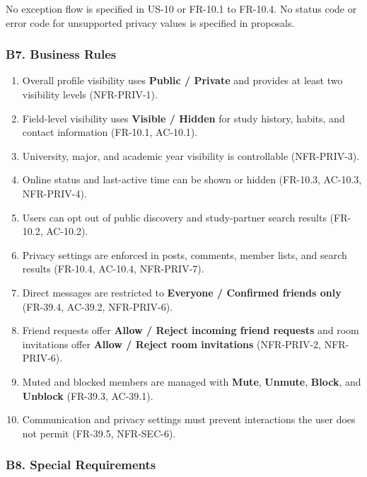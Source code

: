 \documentclass[12pt]{article}
\begin{document}
No exception flow is specified in US-10 or FR-10.1 to FR-10.4. No status code or error code for unsupported privacy values is specified in proposals.
\par\medskip

\hypertarget{sec:b7-business-rules}{}
\subsubsection*{B7. Business Rules}
\par\medskip

\begin{enumerate}
\item Overall profile visibility uses \textbf{Public / Private} and provides at least two visibility levels (NFR-PRIV-1).
\item Field-level visibility uses \textbf{Visible / Hidden} for study history, habits, and contact information (FR-10.1, AC-10.1).
\item University, major, and academic year visibility is controllable (NFR-PRIV-3).
\item Online status and last-active time can be shown or hidden (FR-10.3, AC-10.3, NFR-PRIV-4).
\item Users can opt out of public discovery and study-partner search results (FR-10.2, AC-10.2).
\item Privacy settings are enforced in posts, comments, member lists, and search results (FR-10.4, AC-10.4, NFR-PRIV-7).
\item Direct messages are restricted to \textbf{Everyone / Confirmed friends only} (FR-39.4, AC-39.2, NFR-PRIV-6).
\item Friend requests offer \textbf{Allow / Reject incoming friend requests} and room invitations offer \textbf{Allow / Reject room invitations} (NFR-PRIV-2, NFR-PRIV-6).
\item Muted and blocked members are managed with \textbf{Mute}, \textbf{Unmute}, \textbf{Block}, and \textbf{Unblock} (FR-39.3, AC-39.1).
\item Communication and privacy settings must prevent interactions the user does not permit (FR-39.5, NFR-SEC-6).
\end{enumerate}
\par\medskip

\hypertarget{sec:b8-special-requirements}{}
\subsubsection*{B8. Special Requirements}
\par\medskip
\end{document}
